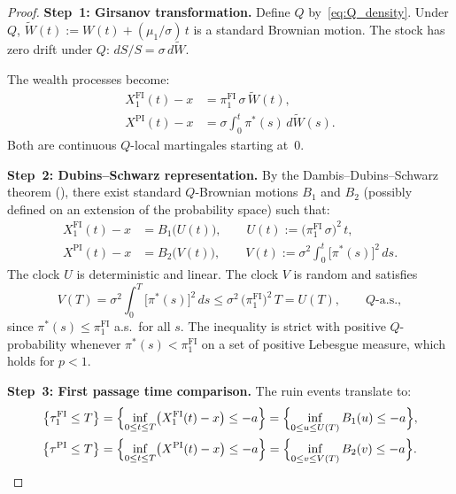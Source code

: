 \documentclass[12pt]{article}
\theoremstyle{remark}
\theoremstyle{definition}
\newcommand{\FI}{\mathrm{FI}}
\newcommand{\PI}{\mathrm{PI}}
\begin{document}
\begin{proof}
\textbf{Step~1: Girsanov transformation.}
Define $Q$ by~\eqref{eq:Q_density}.
Under $Q$, $\widetilde{W}(t) := W(t) + (\mu_1/\sigma)\,t$ is a
standard Brownian motion.
The stock has zero drift under $Q$:
$dS/S = \sigma\,d\widetilde{W}$.

The wealth processes become:
\begin{align}
  X_1^{\FI}(t) - x
    &= \pi_1^{\FI}\,\sigma\,\widetilde{W}(t),
  \label{eq:XFI_Q} \\
  X^{\PI}(t) - x
    &= \sigma\int_0^t \pi^*(s)\,d\widetilde{W}(s).
  \label{eq:XPI_Q}
\end{align}
Both are continuous $Q$-local martingales starting at~$0$.

\medskip
\noindent\textbf{Step~2: Dubins--Schwarz representation.}
By the Dambis--Dubins--Schwarz theorem
(\citealt[Theorem~3.4.6]{KaratzasShreve1991}), there exist standard
$Q$-Brownian motions $B_1$ and $B_2$ (possibly defined on an
extension of the probability space) such that:
\begin{align}
  X_1^{\FI}(t) - x &= B_1\bigl(U(t)\bigr),
    \qquad U(t) := \bigl(\pi_1^{\FI}\,\sigma\bigr)^2\,t,
  \label{eq:DS_FI} \\
  X^{\PI}(t) - x &= B_2\bigl(V(t)\bigr),
    \qquad V(t) := \sigma^2\int_0^t \bigl[\pi^*(s)\bigr]^2\,ds.
  \label{eq:DS_PI}
\end{align}
The clock $U$ is deterministic and linear.
The clock $V$ is random and satisfies
\begin{equation}\label{eq:V_le_U}
  V(T) = \sigma^2\int_0^T \bigl[\pi^*(s)\bigr]^2\,ds
  \le \sigma^2\,\bigl(\pi_1^{\FI}\bigr)^2\,T = U(T),
  \qquad Q\text{-a.s.},
\end{equation}
since $\pi^*(s) \le \pi_1^{\FI}$ a.s.\ for all $s$.
The inequality is strict with positive $Q$-probability whenever
$\pi^*(s) < \pi_1^{\FI}$ on a set of positive Lebesgue measure, which
holds for $p < 1$.

\medskip
\noindent\textbf{Step~3: First passage time comparison.}
The ruin events translate to:
\begin{align}
  \bigl\{\tau_1^{\FI} \le T\bigr\}
    &= \Bigl\{\inf_{0 \le t \le T}\bigl(X_1^{\FI}(t) - x\bigr) \le -a\Bigr\}
     = \Bigl\{\inf_{0 \le u \le U(T)} B_1(u) \le -a\Bigr\},
  \label{eq:ruin_FI_DS} \\
  \bigl\{\tau^{\PI} \le T\bigr\}
    &= \Bigl\{\inf_{0 \le t \le T}\bigl(X^{\PI}(t) - x\bigr) \le -a\Bigr\}
     = \Bigl\{\inf_{0 \le v \le V(T)} B_2(v) \le -a\Bigr\}.
  \label{eq:ruin_PI_DS}
\end{align}


\end{proof}
\end{document}
